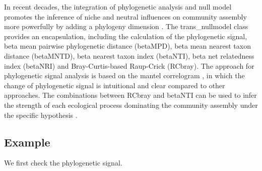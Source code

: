\documentclass[
]{book}
\newenvironment{Shaded}{\begin{snugshade}}{\end{snugshade}}
\newcommand{\AttributeTok}[1]{\textcolor[rgb]{0.13,0.29,0.53}{#1}}
\newcommand{\CommentTok}[1]{\textcolor[rgb]{0.56,0.35,0.01}{\textit{#1}}}
\newcommand{\FloatTok}[1]{\textcolor[rgb]{0.00,0.00,0.81}{#1}}
\newcommand{\FunctionTok}[1]{\textcolor[rgb]{0.13,0.29,0.53}{\textbf{#1}}}
\newcommand{\NormalTok}[1]{#1}
\newcommand{\OtherTok}[1]{\textcolor[rgb]{0.56,0.35,0.01}{#1}}
\newcommand{\SpecialCharTok}[1]{\textcolor[rgb]{0.81,0.36,0.00}{\textbf{#1}}}
\newcommand{\StringTok}[1]{\textcolor[rgb]{0.31,0.60,0.02}{#1}}
\begin{document}
In recent decades,
the integration of phylogenetic analysis and null model promotes the inference of niche and neutral influences on community assembly more powerfully
by adding a phylogeny dimension \citep{Webb_Phylogenies_2002, Picante_Kembel_2010, Stegen_Quantifying_2013}.
The trans\_nullmodel class provides an encapsulation, including the calculation of the phylogenetic signal,
beta mean pairwise phylogenetic distance (betaMPD), beta mean nearest taxon distance (betaMNTD),
beta nearest taxon index (betaNTI), beta net relatedness index (betaNRI) and Bray-Curtis-based Raup-Crick (RCbray).
The approach for phylogenetic signal analysis is based on the mantel correlogram \citep{Liu_Long_term_2017},
in which the change of phylogenetic signal is intuitional and clear compared to other approaches.
The combinations between RCbray and betaNTI can be used to infer the strength of each ecological process dominating the community assembly
under the specific hypothesis \citep{Stegen_Quantifying_2013}.

\subsection{Example}\label{example-7}

We first check the phylogenetic signal.

\begin{Shaded}
\end{Shaded}

\begin{Shaded}
\end{Shaded}
\end{document}
